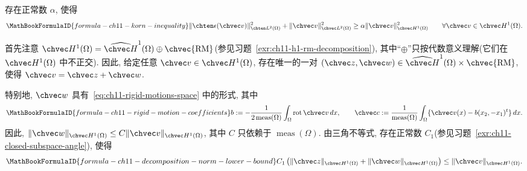 \begin{Theorem}
\label{thm:ch11-korn}
存在正常数 $\alpha$, 使得
\begin{equation}
\MathBookFormulaID{formula-ch11-korn-inequality}
\label{eq:ch11-korn-inequality}
\|\chten\epsilon(\chvec v)\|_{\chten L^2(\Omega)}^2
+\|\chvec v\|_{\chvec L^2(\Omega)}^2
\geq\alpha\|\chvec v\|_{\chvec H^1(\Omega)}^2
\qquad\forall\chvec v\in\chvec H^1(\Omega).
\end{equation}
\end{Theorem}

\begin{Proof}
首先注意 $\chvec H^1(\Omega)=\widehat{\chvec H}^1(\Omega)\oplus\chvec{\mathrm{RM}}$(参见习题~\ref{exr:ch11-h1-rm-decomposition}), 其中``$\oplus$''只按代数意义理解(它们在 $\chvec H^1(\Omega)$ 中不正交). 因此, 给定任意 $\chvec v\in\chvec H^1(\Omega)$, 存在唯一的一对
$(\chvec z,\chvec w)\in\widehat{\chvec H}^1(\Omega)\times\chvec{\mathrm{RM}}$, 使得
$\chvec v=\chvec z+\chvec w$.

特别地, $\chvec w$ 具有~\eqref{eq:ch11-rigid-motions-space} 中的形式, 其中
\begin{equation}
\MathBookFormulaID{formula-ch11-rigid-motion-coefficients}
\label{eq:ch11-rigid-motion-coefficients}
b:=-\frac1{2\operatorname{meas}(\Omega)}
\int_\Omega\operatorname{rot}\chvec v\,dx,
\qquad
\chvec c:=\frac1{\operatorname{meas}(\Omega)}
\int_\Omega\{\chvec v(x)-b(x_2,-x_1)^t\}\,dx.
\end{equation}
因此, $\|\chvec w\|_{\chvec H^1(\Omega)}\leq C\|\chvec v\|_{\chvec H^1(\Omega)}$, 其中 $C$ 只依赖于 $\operatorname{meas}(\Omega)$. 由三角不等式, 存在正常数 $C_1$(参见习题~\ref{exr:ch11-closed-subspace-angle}), 使得
\begin{equation}
\MathBookFormulaID{formula-ch11-decomposition-norm-lower-bound}
\label{eq:ch11-decomposition-norm-lower-bound}
C_1\left(\|\chvec z\|_{\chvec H^1(\Omega)}+
\|\chvec w\|_{\chvec H^1(\Omega)}\right)
\leq\|\chvec v\|_{\chvec H^1(\Omega)}.
\end{equation}


\end{Proof}

